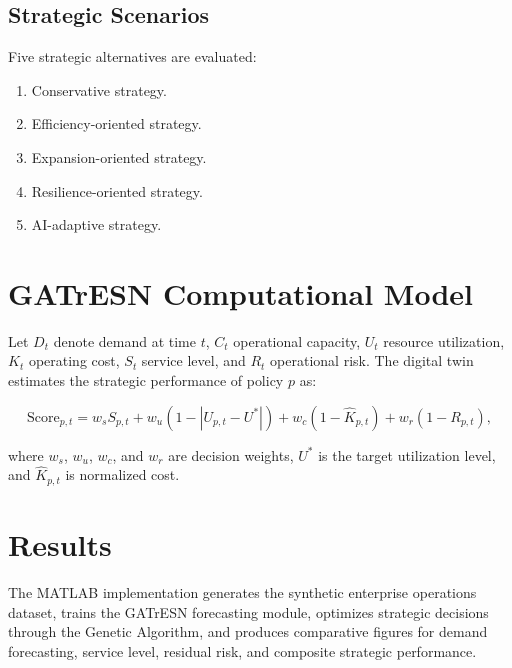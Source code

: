 \documentclass[11pt,a4paper]{article}
\begin{document}
\subsection{Strategic Scenarios}
Five strategic alternatives are evaluated:

\begin{enumerate}
    \item Conservative strategy.
    \item Efficiency-oriented strategy.
    \item Expansion-oriented strategy.
    \item Resilience-oriented strategy.
    \item AI-adaptive strategy.
\end{enumerate}

\section{GATrESN Computational Model}
Let $D_t$ denote demand at time $t$, $C_t$ operational capacity, $U_t$ resource utilization, $K_t$ operating cost, $S_t$ service level, and $R_t$ operational risk. The digital twin estimates the strategic performance of policy $p$ as:

\begin{equation}
    \text{Score}_{p,t} =
    w_s S_{p,t}
    + w_u (1 - |U_{p,t} - U^*|)
    + w_c (1 - \hat{K}_{p,t})
    + w_r (1 - R_{p,t}),
\end{equation}

where $w_s$, $w_u$, $w_c$, and $w_r$ are decision weights, $U^*$ is the target utilization level, and $\hat{K}_{p,t}$ is normalized cost.

\section{Results}
The MATLAB implementation generates the synthetic enterprise operations dataset, trains the GATrESN forecasting module, optimizes strategic decisions through the Genetic Algorithm, and produces comparative figures for demand forecasting, service level, residual risk, and composite strategic performance.
\end{document}
